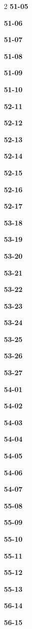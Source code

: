 \documentclass[10pt,a4paper]{article}
\begin{document}
\begin{multicols}{2}
\noindent\textbf{51-05}\ \par
\noindent\textbf{51-06}\ \par
\noindent\textbf{51-07}\ \par
\noindent\textbf{51-08}\ \par
\noindent\textbf{51-09}\ \par
\noindent\textbf{51-10}\ \par
\noindent\textbf{52-11}\ \par
\noindent\textbf{52-12}\ \par
\noindent\textbf{52-13}\ \par
\noindent\textbf{52-14}\ \par
\noindent\textbf{52-15}\ \par
\noindent\textbf{52-16}\ \par
\noindent\textbf{52-17}\ \par
\noindent\textbf{53-18}\ \par
\noindent\textbf{53-19}\ \par
\noindent\textbf{53-20}\ \par
\noindent\textbf{53-21}\ \par
\noindent\textbf{53-22}\ \par
\noindent\textbf{53-23}\ \par
\noindent\textbf{53-24}\ \par
\noindent\textbf{53-25}\ \par
\noindent\textbf{53-26}\ \par
\noindent\textbf{53-27}\ \par
\noindent\textbf{54-01}\ \par
\noindent\textbf{54-02}\ \par
\noindent\textbf{54-03}\ \par
\noindent\textbf{54-04}\ \par
\noindent\textbf{54-05}\ \par
\noindent\textbf{54-06}\ \par
\noindent\textbf{54-07}\ \par
\noindent\textbf{55-08}\ \par
\noindent\textbf{55-09}\ \par
\noindent\textbf{55-10}\ \par
\noindent\textbf{55-11}\ \par
\noindent\textbf{55-12}\ \par
\noindent\textbf{55-13}\ \par
\noindent\textbf{56-14}\ \par
\noindent\textbf{56-15}\ \par

\end{multicols}
\end{document}

